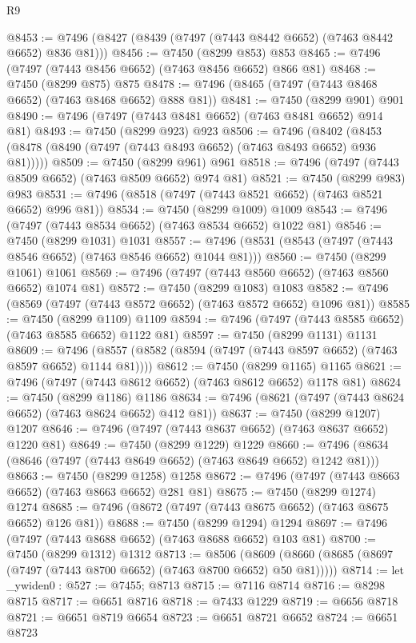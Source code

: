 \begin{lexlean}{R9}
\begin{coremodule}
{{{{{{{{{{{{{{{{{{{{{{{{{{{{{{{{{{{{{{{{{{{{{{{{{{{{{{{{{{{{{{{{{{{{{{{{{{{{{{{{{{{{@8453 := @7496 (@8427 (@8439 (@7497 (@7443 @8442 @6652) (@7463 @8442 @6652) @836 @81)))
@8456 := @7450 (@8299 @853) @853
@8465 := @7496 (@7497 (@7443 @8456 @6652) (@7463 @8456 @6652) @866 @81)
@8468 := @7450 (@8299 @875) @875
@8478 := @7496 (@8465 (@7497 (@7443 @8468 @6652) (@7463 @8468 @6652) @888 @81))
@8481 := @7450 (@8299 @901) @901
@8490 := @7496 (@7497 (@7443 @8481 @6652) (@7463 @8481 @6652) @914 @81)
@8493 := @7450 (@8299 @923) @923
@8506 := @7496
    (@8402 (@8453 (@8478 (@8490 (@7497 (@7443 @8493 @6652) (@7463 @8493 @6652) @936 @81)))))
@8509 := @7450 (@8299 @961) @961
@8518 := @7496 (@7497 (@7443 @8509 @6652) (@7463 @8509 @6652) @974 @81)
@8521 := @7450 (@8299 @983) @983
@8531 := @7496 (@8518 (@7497 (@7443 @8521 @6652) (@7463 @8521 @6652) @996 @81))
@8534 := @7450 (@8299 @1009) @1009
@8543 := @7496 (@7497 (@7443 @8534 @6652) (@7463 @8534 @6652) @1022 @81)
@8546 := @7450 (@8299 @1031) @1031
@8557 := @7496 (@8531 (@8543 (@7497 (@7443 @8546 @6652) (@7463 @8546 @6652) @1044 @81)))
@8560 := @7450 (@8299 @1061) @1061
@8569 := @7496 (@7497 (@7443 @8560 @6652) (@7463 @8560 @6652) @1074 @81)
@8572 := @7450 (@8299 @1083) @1083
@8582 := @7496 (@8569 (@7497 (@7443 @8572 @6652) (@7463 @8572 @6652) @1096 @81))
@8585 := @7450 (@8299 @1109) @1109
@8594 := @7496 (@7497 (@7443 @8585 @6652) (@7463 @8585 @6652) @1122 @81)
@8597 := @7450 (@8299 @1131) @1131
@8609 := @7496 (@8557 (@8582 (@8594 (@7497 (@7443 @8597 @6652) (@7463 @8597 @6652) @1144 @81))))
@8612 := @7450 (@8299 @1165) @1165
@8621 := @7496 (@7497 (@7443 @8612 @6652) (@7463 @8612 @6652) @1178 @81)
@8624 := @7450 (@8299 @1186) @1186
@8634 := @7496 (@8621 (@7497 (@7443 @8624 @6652) (@7463 @8624 @6652) @412 @81))
@8637 := @7450 (@8299 @1207) @1207
@8646 := @7496 (@7497 (@7443 @8637 @6652) (@7463 @8637 @6652) @1220 @81)
@8649 := @7450 (@8299 @1229) @1229
@8660 := @7496 (@8634 (@8646 (@7497 (@7443 @8649 @6652) (@7463 @8649 @6652) @1242 @81)))
@8663 := @7450 (@8299 @1258) @1258
@8672 := @7496 (@7497 (@7443 @8663 @6652) (@7463 @8663 @6652) @281 @81)
@8675 := @7450 (@8299 @1274) @1274
@8685 := @7496 (@8672 (@7497 (@7443 @8675 @6652) (@7463 @8675 @6652) @126 @81))
@8688 := @7450 (@8299 @1294) @1294
@8697 := @7496 (@7497 (@7443 @8688 @6652) (@7463 @8688 @6652) @103 @81)
@8700 := @7450 (@8299 @1312) @1312
@8713 := @8506
    (@8609 (@8660 (@8685 (@8697 (@7497 (@7443 @8700 @6652) (@7463 @8700 @6652) @50 @81)))))
@8714 := let _ywiden0 : @527 := @7455; @8713
@8715 := @7116 @8714
@8716 := @8298 @8715
@8717 := @6651 @8716
@8718 := @7433 @1229
@8719 := @6656 @8718
@8721 := @6651 @8719 @6654
@8723 := @6651 @8721 @6652
@8724 := @6651 @8723
}}}}}}}}}}}}}}}}}}}}}}}}}}}}}}}}}}}}}}}}}}}}}}}}}}}}}}}}}}}}}}}}}}}}}}}}}}}}}}}}}}}}
\end{coremodule}
\end{lexlean}
